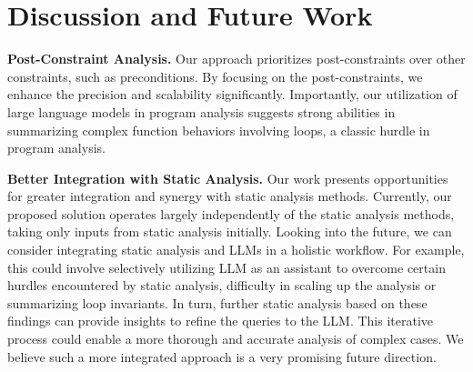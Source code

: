 


\section{Discussion and Future Work}
\label{sec:discuss}


\vspace{3pt}
\noindent
\textbf{Post-Constraint Analysis.} Our approach prioritizes post-constraints
over other constraints, such as preconditions. By focusing on the post-constraints, we enhance the precision and scalability significantly. 
Importantly, our utilization of large language models in program analysis
suggests strong abilities in summarizing complex function behaviors involving loops, a classic hurdle in program analysis.


\vspace{3pt}
\noindent
\textbf{Better Integration with Static Analysis.} Our work presents
opportunities for greater integration and synergy with static analysis methods.
Currently, our proposed solution operates largely independently of the static analysis methods, taking only inputs from static analysis initially.
Looking into the future, we can consider integrating static analysis and LLMs in a holistic workflow.
For example, this could involve selectively utilizing LLM as an assistant to overcome certain hurdles encountered by static analysis,
\eg difficulty in scaling up the analysis or summarizing loop invariants.
In turn, further static analysis based on these findings can provide insights to refine the queries to the LLM. This iterative process
could enable a more thorough and accurate analysis of complex cases.
We believe such a more integrated approach is a very promising future direction.


